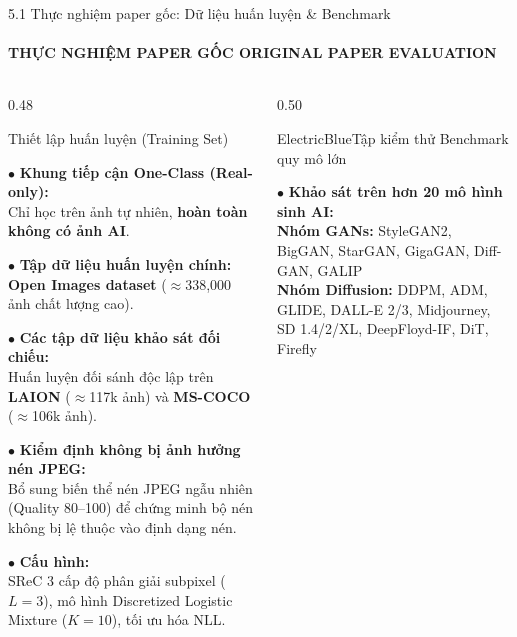 \documentclass[aspectratio=169, 10pt, t]{beamer}
\begin{document}
\begin{frame}{5.1 Thực nghiệm paper gốc: Dữ liệu huấn luyện \& Benchmark}
  \framesubtitle{THỰC NGHIỆM PAPER GỐC \;\textbar\; ORIGINAL PAPER EVALUATION}
  \begin{columns}[t, totalwidth=\linewidth]
    \begin{column}{0.48\linewidth}
      \begin{cleanbox}[equal height group=origexp, top=0.8mm, bottom=0.8mm]{Thiết lập huấn luyện (Training Set)}
        \raggedright\scriptsize
        $\bullet$ \textbf{Khung tiếp cận One-Class (Real-only):}\\
        Chỉ học trên ảnh tự nhiên, \textbf{hoàn toàn không có ảnh AI}.
        \vspace{0.18em}

        $\bullet$ \textbf{Tập dữ liệu huấn luyện chính:}\\
        \textbf{Open Images dataset} ($\approx$338,000 ảnh chất lượng cao).
        \vspace{0.18em}

        $\bullet$ \textbf{Các tập dữ liệu khảo sát đối chiếu:}\\
        Huấn luyện đối sánh độc lập trên \textbf{LAION} ($\approx$117k ảnh) và \textbf{MS-COCO} ($\approx$106k ảnh).
        \vspace{0.18em}

        $\bullet$ \textbf{Kiểm định không bị ảnh hưởng nén JPEG:}\\
        Bổ sung biến thể nén JPEG ngẫu nhiên (Quality 80--100) để chứng minh bộ nén không bị lệ thuộc vào định dạng nén.
        \vspace{0.18em}

        $\bullet$ \textbf{Cấu hình:}\\
        SReC 3 cấp độ phân giải subpixel ($L=3$), mô hình Discretized Logistic Mixture ($K=10$), tối ưu hóa NLL.
      \end{cleanbox}
    \end{column}
    \begin{column}{0.50\linewidth}
      \begin{accentbox}[equal height group=origexp, top=0.8mm, bottom=0.8mm]{ElectricBlue}{Tập kiểm thử Benchmark quy mô lớn}
        \raggedright\scriptsize
        $\bullet$ \textbf{Khảo sát trên hơn 20 mô hình sinh AI:}\\
        \vspace{0.08em}
        {\tiny
        \textbf{Nhóm GANs:} StyleGAN2, BigGAN, StarGAN, GigaGAN, Diff-GAN, GALIP\\[0.15em]
        \textbf{Nhóm Diffusion:} DDPM, ADM, GLIDE, DALL-E 2/3, Midjourney, SD 1.4/2/XL, DeepFloyd-IF, DiT, Firefly}
        \vspace{0.18em}


\end{accentbox}
\end{column}
\end{columns}
\end{frame}
\end{document}
